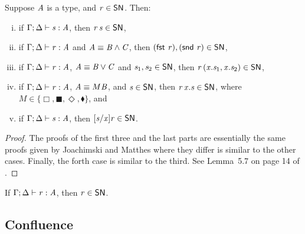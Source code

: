 \begin{lemma}
  \label{lemma:typable_eliminations_are_in_SN}
  Suppose $\mathit{A}$ is a type, and $\mathit{r} \in \mathsf{SN}$.  Then:
  \begin{enumerate}[i.]
  \item if $\Gamma  ;  \Delta  \vdash  \mathit{s}  :  \mathit{A}$, then $\mathit{r} \, \mathit{s} \in \mathsf{SN}$,
  \item if $\Gamma  ;  \Delta  \vdash  \mathit{r}  :  \mathit{A}$ and $\mathit{A} \equiv  \mathit{B}  \land  \mathit{C} $, then $(  \mathsf{fst}\, \, \mathit{r}  ),(  \mathsf{snd}\, \, \mathit{r}  ) \in \mathsf{SN}$,
  \item if $\Gamma  ;  \Delta  \vdash  \mathit{r}  :  \mathit{A}$, $\mathit{A} \equiv  \mathit{B}  \lor  \mathit{C} $ and $\mathit{s_{{\mathrm{1}}}},\mathit{s_{{\mathrm{2}}}} \in \mathsf{SN}$,
    then $\mathit{r} \,  ( \mathit{x} . \mathit{s_{{\mathrm{1}}}} , \mathit{x} . \mathit{s_{{\mathrm{2}}}} )  \in \mathsf{SN}$,
  \item if $\Gamma  ;  \Delta  \vdash  \mathit{r}  :  \mathit{A}$, $\mathit{A} \equiv  \mathbin{M}  \mathit{B} $, and $\mathit{s} \in \mathsf{SN}$, then $\mathit{r} \,  \mathit{x} . \mathit{s}  \in \mathsf{SN}$,
    where $M \in \{ \Box ,  \blacksquare ,  \Diamond ,  \mathbin{\blacklozenge}  \}$, and
  \item if $\Gamma  ;  \Delta  \vdash  \mathit{s}  :  \mathit{A}$, then $[  \mathit{s}  /  \mathit{x}  ]  \mathit{r} \in \mathsf{SN}$.
  \end{enumerate}
\end{lemma}
\begin{proof}
  The proofs of the first three and the last parts are essentially the
  same proofs given by Joachimski and Matthes where they differ is
  similar to the other cases.  Finally, the forth case is similar to
  the third. See Lemma~5.7 on page 14 of \cite{Joachimski:2003}.
\end{proof}

\begin{corollary}
  \label{corollary:strong_normalization}
  If $\Gamma  ;  \Delta  \vdash  \mathit{r}  :  \mathit{A}$, then $\mathit{r} \in \mathsf{SN}$.
\end{corollary}


\subsection{Confluence}
\label{subsec:confluence}

